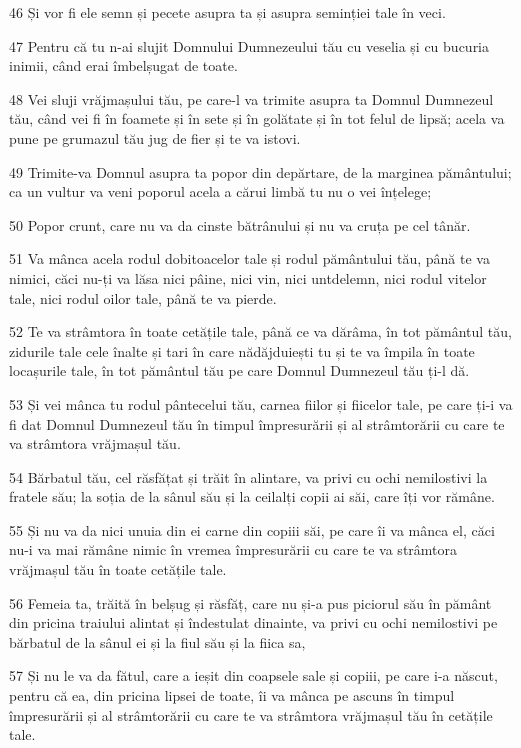 \par 46 Și vor fi ele semn și pecete asupra ta și asupra seminției tale în veci.
\par 47 Pentru că tu n-ai slujit Domnului Dumnezeului tău cu veselia și cu bucuria inimii, când erai îmbelșugat de toate.
\par 48 Vei sluji vrăjmașului tău, pe care-l va trimite asupra ta Domnul Dumnezeul tău, când vei fi în foamete și în sete și în golătate și în tot felul de lipsă; acela va pune pe grumazul tău jug de fier și te va istovi.
\par 49 Trimite-va Domnul asupra ta popor din depărtare, de la marginea pământului; ca un vultur va veni poporul acela a cărui limbă tu nu o vei înțelege;
\par 50 Popor crunt, care nu va da cinste bătrânului și nu va cruța pe cel tânăr.
\par 51 Va mânca acela rodul dobitoacelor tale și rodul pământului tău, până te va nimici, căci nu-ți va lăsa nici pâine, nici vin, nici untdelemn, nici rodul vitelor tale, nici rodul oilor tale, până te va pierde.
\par 52 Te va strâmtora în toate cetățile tale, până ce va dărâma, în tot pământul tău, zidurile tale cele înalte și tari în care nădăjduiești tu și te va împila în toate locașurile tale, în tot pământul tău pe care Domnul Dumnezeul tău ți-l dă.
\par 53 Și vei mânca tu rodul pântecelui tău, carnea fiilor și fiicelor tale, pe care ți-i va fi dat Domnul Dumnezeul tău în timpul împresurării și al strâmtorării cu care te va strâmtora vrăjmașul tău.
\par 54 Bărbatul tău, cel răsfățat și trăit în alintare, va privi cu ochi nemilostivi la fratele său; la soția de la sânul său și la ceilalți copii ai săi, care îți vor rămâne.
\par 55 Și nu va da nici unuia din ei carne din copiii săi, pe care îi va mânca el, căci nu-i va mai rămâne nimic în vremea împresurării cu care te va strâmtora vrăjmașul tău în toate cetățile tale.
\par 56 Femeia ta, trăită în belșug și răsfăț, care nu și-a pus piciorul său în pământ din pricina traiului alintat și îndestulat dinainte, va privi cu ochi nemilostivi pe bărbatul de la sânul ei și la fiul său și la fiica sa,
\par 57 Și nu le va da fătul, care a ieșit din coapsele sale și copiii, pe care i-a născut, pentru că ea, din pricina lipsei de toate, îi va mânca pe ascuns în timpul împresurării și al strâmtorării cu care te va strâmtora vrăjmașul tău în cetățile tale.
